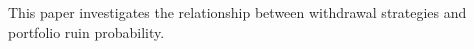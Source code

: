 
This paper investigates the relationship between withdrawal strategies and portfolio ruin probability.


